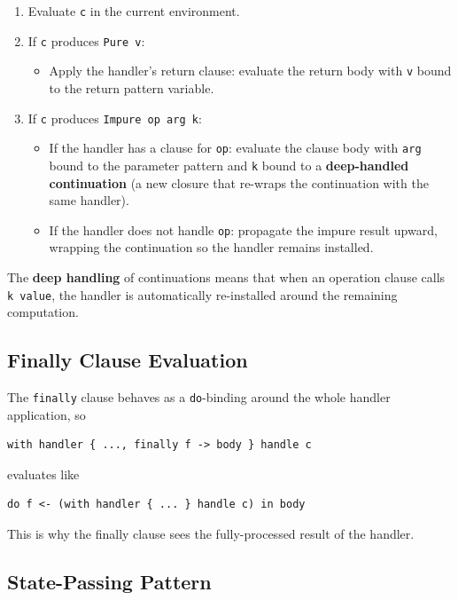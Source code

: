 \documentclass[11pt,a4paper]{article}
\newcommand{\cba}[1]{\lstinline[style=cbainline]{#1}}
\begin{document}
\begin{enumerate}
  \item Evaluate \texttt{c} in the current environment.
  \item If \texttt{c} produces \texttt{Pure v}:
    \begin{itemize}
      \item Apply the handler's return clause: evaluate the return body with
            \texttt{v} bound to the return pattern variable.
    \end{itemize}
  \item If \texttt{c} produces \texttt{Impure op arg k}:
    \begin{itemize}
      \item If the handler has a clause for \texttt{op}: evaluate the clause
            body with \texttt{arg} bound to the parameter pattern and
            \texttt{k} bound to a \textbf{deep-handled continuation} (a new
            closure that re-wraps the continuation with the same handler).
      \item If the handler does not handle \texttt{op}: propagate the impure
            result upward, wrapping the continuation so the handler remains
            installed.
    \end{itemize}
\end{enumerate}

The \textbf{deep handling} of continuations means that when an operation clause
calls \texttt{k value}, the handler is automatically re-installed around the
remaining computation.

\subsection{Finally Clause Evaluation}

The \cba{finally} clause behaves as a \cba{do}-binding around the whole handler application, so

\begin{lstlisting}
with handler { ..., finally f -> body } handle c
\end{lstlisting}

evaluates like

\begin{lstlisting}
do f <- (with handler { ... } handle c) in body
\end{lstlisting}

This is why the finally clause sees the fully-processed result of the handler.

\subsection{State-Passing Pattern}
\end{document}
